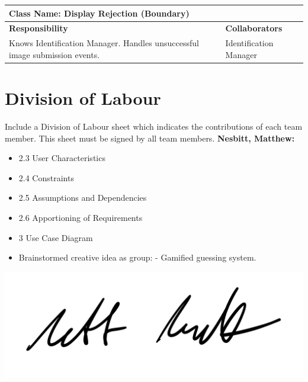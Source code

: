 \documentclass[]{article}
\begin{document}
	\begin{table}[H]
		\centering
		\begin{tabular}{|p{8cm}|p{8cm}|}
		\hline
		\multicolumn{2}{|l|}{\textbf{Class Name:} Display Rejection (Boundary)} \\
		\hline
		\textbf{Responsibility} & \textbf{Collaborators} \\
		\hline
		Knows Identification Manager. \newline Handles unsuccessful image submission events. & Identification Manager \\
		\hline
		\end{tabular}
	\end{table}

\appendix
\section{Division of Labour}
Include a Division of Labour sheet which indicates the contributions of each team member. This sheet must be signed by all team members.
\label{sec:division_of_labour}
\textbf{Nesbitt, Matthew:}
\begin{itemize}
	\item 2.3 User Characteristics
	\item 2.4 Constraints
	\item 2.5 Assumptions and Dependencies
	\item 2.6 Apportioning of Requirements
	\item 3 Use Case Diagram
	\item Brainstormed creative idea as group:
		\subitem - Gamified guessing system.
\end{itemize}
\includegraphics[scale=0.15]{mattsignature.jpg}
\end{document}
